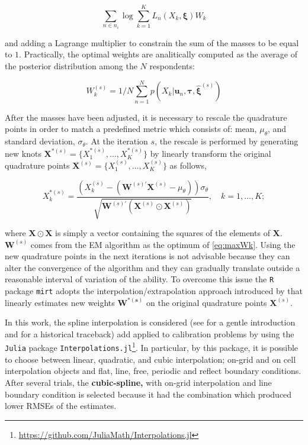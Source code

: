 \begin{equation}\label{eq:maxWk}
\sum_{n \in n_i}{\log{\sum_{k=1}^K{{\mathit{L_n}(X_k,\boldsymbol{\xi})}W_k}}} 
\end{equation} 

and adding a Lagrange multiplier to constrain the sum of the masses to be equal to $1$. 
Practically, the optimal weights are analitically computed as the average of the posterior distribution among the $N$ respondents: 

\begin{equation} \label{eq:updateWk}
W_k^{(s)}  = 1/N \sum_{n=1}^N{p(X_k|\boldsymbol{u}_n,\boldsymbol{\tau},\hat{\boldsymbol{\xi}}^{(s)})} 
\end{equation}

After the masses have been adjusted, it is necessary to rescale the quadrature points in order to match a predefined metric which consists of: mean, $\mu_\theta$, and standard deviation, $\sigma_\theta$. At the iteration $s$, the rescale is performed by generating new knots $\boldsymbol{X}^{*(s)}=\{X_1^{*(s)},\ldots,X_K^{*(s)}\}$ by linearly transform the original quadrature points $\boldsymbol{X}^{(s)}=\{X_1^{(s)},\ldots,X_K^{(s)}\}$ as follows,

\begin{equation}\label{eq:rescale}
X_k^{*(s)}=\frac{(X_k^{(s)}-(\boldsymbol{W}^{(s)'}\boldsymbol{X}^{(s)}-\mu_\theta))\sigma_\theta}{\sqrt{\boldsymbol{W}^{(s)'}(\boldsymbol{X}^{(s)}\odot \boldsymbol{X}^{(s)})}}, \quad  k=1,\ldots,K;
\end{equation}

where $\boldsymbol{X} \odot \boldsymbol{X}$ is simply a vector containing the squares of the elements of $\boldsymbol{X}$. $\boldsymbol{W}^{(s)}$ comes from the EM algorithm as the optimum of \eqref{eq:maxWk}.
Using the new quadrature points in the next iterations is not advisable because they can alter the convergence of the algorithm and they can gradually translate outside a reasonable interval of variation of the ability. To overcome this issue the \texttt{R} package \texttt{mirt} adopts the interpolation/extrapolation approach introduced by \textcite{woods2007} that linearly estimates new weights $\boldsymbol{W^{*(s)}}$ on the original quadrature points $\boldsymbol{X}^{(s)}$. 

In this work, the spline interpolation is considered (see \textcite{de1978practical} for a gentle introduction and \textcite{meijering2002chronology} for a historical traceback) add applied to calibration problems by using the \texttt{Julia} package \texttt{Interpolations.jl}\footnote{\url{https://github.com/JuliaMath/Interpolations.jl}}.
In particular, by this package, it is possible to choose between linear, quadratic, and cubic interpolation; on-grid and on cell interpolation objects and flat, line, free, periodic and reflect boundary conditions. After several trials, the \textbf{cubic-spline,} with on-grid interpolation and line boundary condition is selected because it had the combination which produced lower RMSEs of the estimates.


